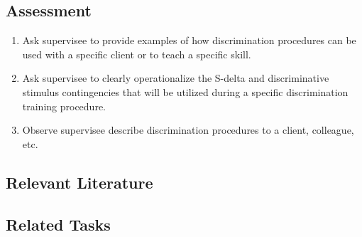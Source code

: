 \subsection{Assessment}
\begin{enumerate}
\item Ask supervisee to provide examples of how discrimination procedures can be used with a specific client or to teach a specific skill.
\item Ask supervisee to clearly operationalize the S-delta and discriminative stimulus contingencies that will be utilized during a specific discrimination training procedure.
\item Observe supervisee describe discrimination procedures to a client, colleague, etc.
\end{enumerate}
%
\subsection{Relevant Literature}
\begin{refsection}
\nocite{test,alang2017police,clayton2018black}
\printbibliography[heading=none]
\end{refsection}
%
\subsection{Related Tasks}
\fourdEight{}\\
\foureOne{}\\
\foureThree{}\\
\foureThirteen{}\\
\fourjEleven{}\\
\fourFKEleven{}\\
\fourFKTwentyFour{}\\
\fourFKTwentyFive{}\\
\fourFKThirtyFive{}\\
%
%
%
\section{\foureThree{}}
